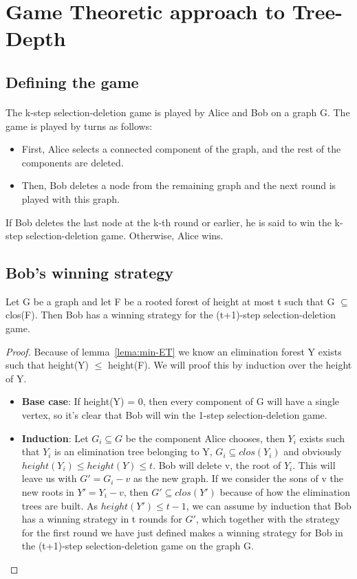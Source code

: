 \section{Game Theoretic approach to Tree-Depth}

\subsection{Defining the game}
\paragraph{}
The k-step selection-deletion game is played by Alice and Bob on a graph G. The game is played by turns as follows:
\begin{itemize}
  \item First, Alice selects a connected component of the graph, and the rest of the components are deleted.
  \item Then, Bob deletes a node from the remaining graph and the next round is played with this graph.
\end{itemize}

If Bob deletes the last node at the k-th round or earlier, he is said to win the k-step selection-deletion game. Otherwise, Alice wins. 

\subsection{Bob's winning strategy}
\begin{lemma}
Let G be a graph and let F be a rooted forest of height at most t such that G $\subseteq$ clos(F). Then Bob has a winning strategy for the (t+1)-step selection-deletion game.
\label{lemma:Bob-win}
\end{lemma}
\begin{proof}
Because of lemma~\ref{lema:min-ET} we know an elimination forest Y exists such that height(Y) $\leq$ height(F).
We will proof this by induction over the height of Y.
\begin{itemize}
  \item \textbf{Base case}: If height(Y) = 0, then every component of G will have a single vertex, so it's clear that Bob will win the 1-step selection-deletion game.
  \item \textbf{Induction}: Let $G_i \subseteq G$ be the component Alice chooses, then $Y_i$ exists such that $Y_i$ is an elimination tree belonging to Y, $G_i \subseteq clos(Y_i)$ and obviously $height(Y_i) \leq height(Y) \leq t$. Bob will delete v, the root of $Y_i$. This will leave us with $G' = G_i - v$ as the new graph. If we consider the sons of v the new roots in $Y' = Y_i - v$, then $G' \subseteq clos(Y')$ because of how the elimination trees are built. As $height(Y') \leq t-1$, we can assume by induction that Bob has a winning strategy in t rounds for $G'$, which together with the strategy for the first round we have just defined makes a winning strategy for Bob in the (t+1)-step selection-deletion game on the graph G.
\end{itemize}
\end{proof}

